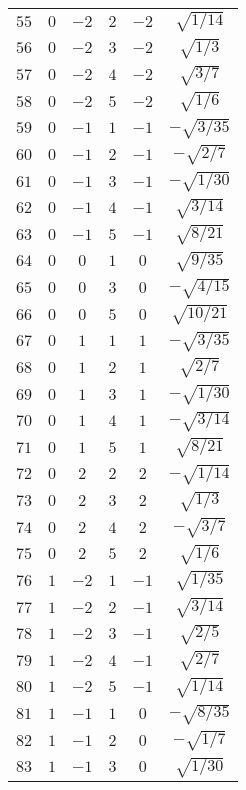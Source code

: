 \begin{table}
\begin{center}
\begin{tabular}{|c|c|c|c|c|c|}
$55$ & $0$ & $-2$ & $2$ & $-2$ & $\sqrt{1/14}$ \\ 
$56$ & $0$ & $-2$ & $3$ & $-2$ & $\sqrt{1/3}$ \\ 
$57$ & $0$ & $-2$ & $4$ & $-2$ & $\sqrt{3/7}$ \\ 
$58$ & $0$ & $-2$ & $5$ & $-2$ & $\sqrt{1/6}$ \\ 
$59$ & $0$ & $-1$ & $1$ & $-1$ & $-\sqrt{3/35}$ \\ 
$60$ & $0$ & $-1$ & $2$ & $-1$ & $-\sqrt{2/7}$ \\ 
$61$ & $0$ & $-1$ & $3$ & $-1$ & $-\sqrt{1/30}$ \\ 
$62$ & $0$ & $-1$ & $4$ & $-1$ & $\sqrt{3/14}$ \\ 
$63$ & $0$ & $-1$ & $5$ & $-1$ & $\sqrt{8/21}$ \\ 
$64$ & $0$ & $0$ & $1$ & $0$ & $\sqrt{9/35}$ \\ 
$65$ & $0$ & $0$ & $3$ & $0$ & $-\sqrt{4/15}$ \\ 
$66$ & $0$ & $0$ & $5$ & $0$ & $\sqrt{10/21}$ \\ 
$67$ & $0$ & $1$ & $1$ & $1$ & $-\sqrt{3/35}$ \\ 
$68$ & $0$ & $1$ & $2$ & $1$ & $\sqrt{2/7}$ \\ 
$69$ & $0$ & $1$ & $3$ & $1$ & $-\sqrt{1/30}$ \\ 
$70$ & $0$ & $1$ & $4$ & $1$ & $-\sqrt{3/14}$ \\ 
$71$ & $0$ & $1$ & $5$ & $1$ & $\sqrt{8/21}$ \\ 
$72$ & $0$ & $2$ & $2$ & $2$ & $-\sqrt{1/14}$ \\ 
$73$ & $0$ & $2$ & $3$ & $2$ & $\sqrt{1/3}$ \\ 
$74$ & $0$ & $2$ & $4$ & $2$ & $-\sqrt{3/7}$ \\ 
$75$ & $0$ & $2$ & $5$ & $2$ & $\sqrt{1/6}$ \\ 
$76$ & $1$ & $-2$ & $1$ & $-1$ & $\sqrt{1/35}$ \\ 
$77$ & $1$ & $-2$ & $2$ & $-1$ & $\sqrt{3/14}$ \\ 
$78$ & $1$ & $-2$ & $3$ & $-1$ & $\sqrt{2/5}$ \\ 
$79$ & $1$ & $-2$ & $4$ & $-1$ & $\sqrt{2/7}$ \\ 
$80$ & $1$ & $-2$ & $5$ & $-1$ & $\sqrt{1/14}$ \\ 
$81$ & $1$ & $-1$ & $1$ & $0$ & $-\sqrt{8/35}$ \\ 
$82$ & $1$ & $-1$ & $2$ & $0$ & $-\sqrt{1/7}$ \\ 
$83$ & $1$ & $-1$ & $3$ & $0$ & $\sqrt{1/30}$ \\ 

\end{tabular}
\end{center}
\end{table}
